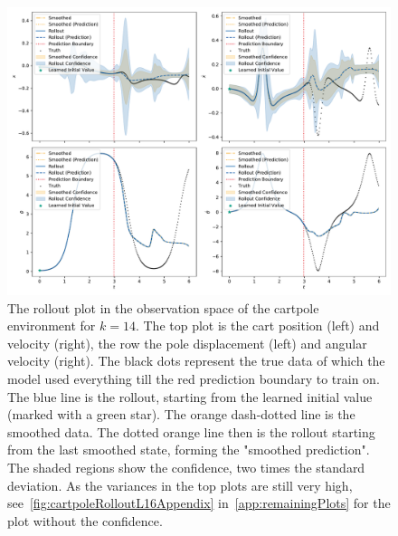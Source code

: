 		\begin{figure}
			\centering
			\includegraphics[width=\linewidth]{figures/results/cartpole-gym/run-latent-dim-16/rollout-observations-N0.pdf}
			\caption{The rollout plot in the observation space of the cartpole environment for \(k = 14\). The top plot is the cart position (left) and velocity (right), the row the pole displacement (left) and angular velocity (right). The black dots represent the true data of which the model used everything till the red prediction boundary to train on. The blue line is the rollout, starting from the learned initial value (marked with a green star). The orange dash-dotted line is the smoothed data. The dotted orange line then is the rollout starting from the last smoothed state, forming the "smoothed prediction". The shaded regions show the confidence, \ie two times the standard deviation. As the variances in the top plots are still very high, see~\autoref{fig:cartpoleRolloutL16Appendix} in~\autoref{app:remainingPlots} for the plot without the confidence.}
			\label{fig:cartpoleRolloutL16}
		\end{figure}
